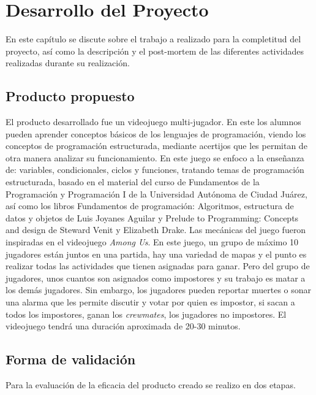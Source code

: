 \chapter{Desarrollo del Proyecto}
En este capítulo se discute sobre el trabajo a realizado para la completitud del proyecto, así como la descripción y el post-mortem de las diferentes actividades realizadas durante su realización.

\section{Producto propuesto}
El producto desarrollado fue un videojuego multi-jugador. En este los alumnos pueden aprender conceptos básicos de los lenguajes de programación, viendo los conceptos de programación estructurada, mediante acertijos que les permitan de otra manera analizar su funcionamiento. En este juego se enfoco a la enseñanza de: variables, condicionales, ciclos y funciones, tratando temas de programación estructurada, basado en el material del curso de Fundamentos de la Programación y Programación I de la Universidad Autónoma de Ciudad Juárez, así como los libros Fundamentos de programación: Algoritmos, estructura de datos y objetos de Luis Joyanes Aguilar y Prelude to Programming: Concepts and design de Steward Venit y Elizabeth Drake. 
Las mecánicas del juego fueron inspiradas en el videojuego \textit{Among Us}. En este juego, un grupo de máximo 10 jugadores están juntos en una partida, hay una variedad de mapas y el punto es realizar todas las actividades que tienen asignadas para ganar. Pero del grupo de jugadores, unos cuantos son asignados como impostores y su trabajo es matar a los demás jugadores. Sin embargo, los jugadores pueden reportar muertes o sonar una alarma que les permite discutir y votar por quien es impostor, si sacan a todos los impostores, ganan los \textit{crewmates}, los jugadores no impostores.
El videojuego tendrá una duración aproximada de 20-30 minutos.

\section{Forma de validación}
Para la evaluación de la eficacia del producto creado se realizo en dos etapas.

